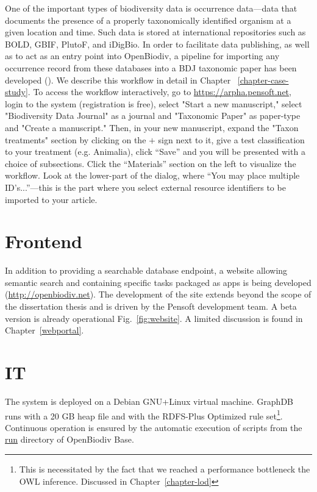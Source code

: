 One of the important types of biodiversity data is occurrence data---data that documents the presence of a properly taxonomically identified organism at a given location and time. Such data is stored at international repositories such as BOLD, GBIF, PlutoF, and iDigBio. In order to facilitate data publishing, as well as to act as an entry point into OpenBiodiv, a pipeline for importing any occurrence record from these databases into a BDJ taxonomic paper has been developed (\cite{senderov_online_2016}). We describe this workflow in detail in Chapter ~\ref{chapter-case-study}. To access the workflow interactively, go to \url{https://arpha.pensoft.net}, login to the system (registration is free), select "Start a new manuscript," select "Biodiversity Data Journal" as a journal and "Taxonomic Paper" as paper-type and "Create a manuscript." Then, in your new manuscript, expand the "Taxon treatments" section by clicking on the $+$ sign next to it, give a test classification to your treatment (e.g. Animalia), click ``Save'' and you will be presented with a choice of subsections. Click the ``Materials'' section on the left to visualize the workflow. Look at the lower-part of the dialog, where ``You may place multiple ID's...''---this is the part where you select external resource identifiers to be imported to your article.

\section{Frontend}

In addition to providing a searchable database endpoint, a website allowing semantic search and containing specific tasks packaged as apps is being developed (\url{http://openbiodiv.net}). The development of the site extends beyond the scope of the dissertation thesis and is driven by the Pensoft development team. A beta version is already operational Fig.~\ref{fig:website}. A limited discussion is found in Chapter~\ref{webportal}.

\section{IT}

The system is deployed on a Debian GNU+Linux virtual machine. GraphDB runs with a 20 GB heap file and with the RDFS-Plus Optimized rule set\footnote{This is necessitated by the fact that we reached a performance bottleneck the OWL inference. Discussed in Chapter~\ref{chapter-lod}}.  Continuous operation is ensured by the automatic execution of scripts from the \url{run} directory of OpenBiodiv Base.

